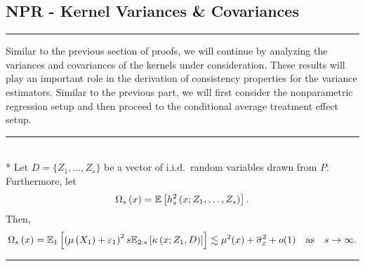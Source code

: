 \subsection{NPR - Kernel Variances \& Covariances}
\hrule
Similar to the previous section of proofs, we will continue by analyzing the variances and covariances of the kernels under consideration.
These results will play an important role in the derivation of consistency properties for the variance estimators.
Similar to the previous part, we will first consider the nonparametric regression setup and then proceed to the conditional average treatment effect setup.
\vspace{0.5cm}
\hrule
\begin{lem}\label{lem:omega_s}\mbox{}\\*
	Let $D = \{Z_1, \dotsc, Z_{s}\}$ be a vector of i.i.d.\ random variables drawn from $P$.
	Furthermore, let
	\begin{equation}
		\Omega_{s}\left(x\right)
		= \mathbb{E}\left[h_{s}^{2}\left(x; Z_1, \ldots,  Z_{s}\right)\right].
	\end{equation}
	Then,
	\begin{equation}
		\Omega_{s}\left(x\right)
		= \mathbb{E}_{1}\left[\left(\mu\left(X_1\right)+ \varepsilon_1\right)^2 s \mathbb{E}_{2:s}\left[\kappa\left(x; Z_1, D\right)\right]\right]
		\lesssim \mu^2(x) + \overline{\sigma}_{\varepsilon}^2 + o(1)
		\quad \text{as} \quad s \rightarrow \infty.
	\end{equation}
\end{lem}
\hrule
